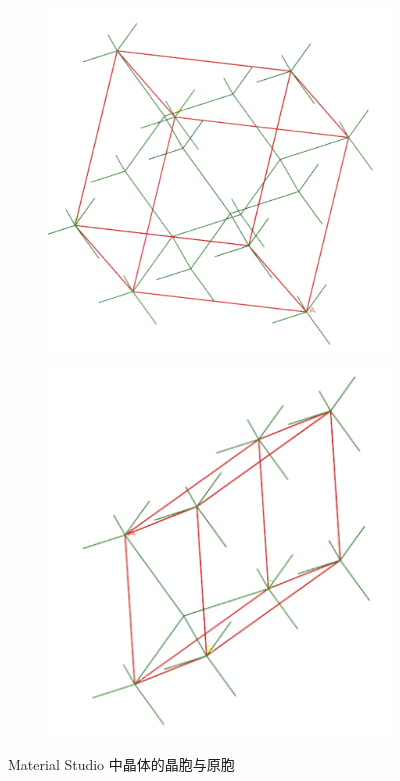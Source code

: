 \begin{figure}
    \centering
    \begin{subfigure}[c]{0.4\linewidth}
        \includegraphics[width=\linewidth]{screenshots/unit-cell.png}
    \end{subfigure}
    \begin{subfigure}[c]{0.4\linewidth}
        \includegraphics[width=\linewidth]{screenshots/primitve-cell.png}
    \end{subfigure}
    \caption{Material Studio 中晶体的晶胞与原胞}\label{fig:ms-cells}
\end{figure}

